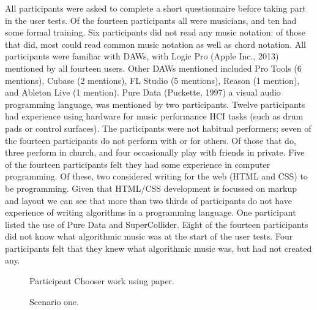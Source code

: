 \documentclass{ppig}
\begin{document}
All participants were asked to complete a short questionnaire before
taking part in the user tests. Of the fourteen participants all were
musicians, and ten had some formal training. Six participants did not
read any music notation: of those that did, most could read common music
notation as well as chord notation. All participants were familiar with
DAWs, with Logic Pro (Apple Inc., 2013) mentioned by all fourteen users.
Other DAWs mentioned included Pro Tools (6 mentions), Cubase (2
mentions), FL Studio (5 mentions), Reason (1 mention), and Ableton Live
(1 mention). Pure Data (Puckette, 1997) a visual audio programming
language, was mentioned by two participants. Twelve participants had
experience using hardware for music performance HCI tasks (such as drum
pads or control surfaces). The participants were not habitual
performers; seven of the fourteen participants do not perform with or
for others. Of those that do, three perform in church, and four
occasionally play with friends in private. Five of the fourteen
participants felt they had some experience in computer programming. Of
these, two considered writing for the web (HTML and CSS) to be
programming. Given that HTML/CSS development is focussed on markup and
layout we can see that more than two thirds of participants do not have
experience of writing algorithms in a programming language. One
participant listed the use of Pure Data and SuperCollider. Eight of the
fourteen participants did not know what algorithmic music was at the
start of the user tests. Four participants felt that they knew what
algorithmic music was, but had not created any.

\begin{figure}[!h]
	\begin{floatrow}
			{\caption{Participant Chooser work using paper.}\label{fig:paper}}
			{\caption{Scenario one.}\label{fig:scenario1}}
	\end{floatrow}
\end{figure}
\end{document}
